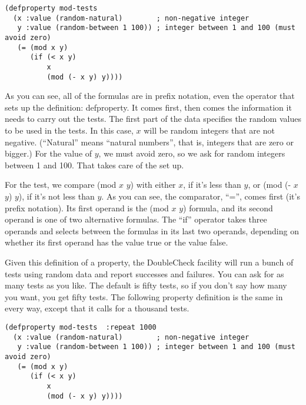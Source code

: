 \begin{lstlisting}
(defproperty mod-tests
  (x :value (random-natural)        ; non-negative integer
   y :value (random-between 1 100)) ; integer between 1 and 100 (must avoid zero)
   (= (mod x y)
      (if (< x y)
          x
          (mod (- x y) y))))
\end{lstlisting}

As you can see, all of the formulas are in prefix notation, even the operator that sets up the definition: defproperty. It comes first, then comes the information it needs to carry out the tests. The first part of the data specifies the random values to be used in the tests. In this case, $x$ will be random integers that are not negative. (``Natural'' means ``natural numbers'', that is, integers that are zero or bigger.) For the value of $y$, we must avoid zero, so we ask for random integers between 1 and 100. That takes care of the set up.

For the test, we compare (mod $x$ $y$) with either $x$, if it's less than $y$, or (mod (- $x$ $y$) $y$), if it's not less than $y$. As you can see, the comparator, ``='', comes first (it's prefix notation). Its first operand is the (mod $x$ $y$) formula, and its second operand is one of two alternative formulas. The ``if'' operator takes three operands and selects between the formulas in its last two operands, depending on whether its first operand has the value true or the value false.

Given this definition of a property, the DoubleCheck facility will run a bunch of tests using random data and report successes and failures. You can ask for as many tests as you like. The default is fifty tests, so if you don't say how many you want, you get fifty tests. The following property definition is the same in every way, except that it calls for a thousand tests.

\begin{lstlisting}
(defproperty mod-tests  :repeat 1000
  (x :value (random-natural)        ; non-negative integer
   y :value (random-between 1 100)) ; integer between 1 and 100 (must avoid zero)
   (= (mod x y)
      (if (< x y)
          x
          (mod (- x y) y))))
\end{lstlisting}

